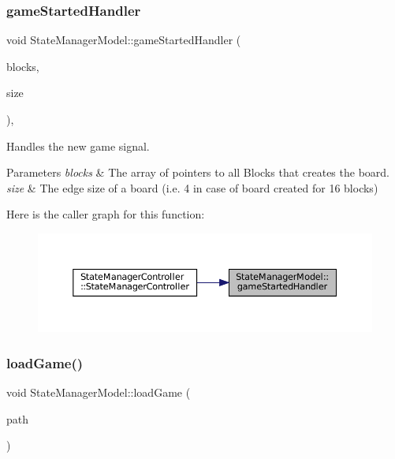 \subsubsection{\texorpdfstring{gameStartedHandler}{gameStartedHandler}}
{\footnotesize\ttfamily void State\+Manager\+Model\+::game\+Started\+Handler (\begin{DoxyParamCaption}\item[{const std\+::vector$<$ std\+::shared\+\_\+ptr$<$ \mbox{\hyperlink{class_block}{Block}}$<$ \mbox{\hyperlink{class_block_layout_item}{Block\+Layout\+Item}} $>$$>$$>$ \&}]{blocks,  }\item[{const size\+\_\+t \&}]{size }\end{DoxyParamCaption})\hspace{0.3cm}{\ttfamily [inline]}, {\ttfamily [slot]}}



Handles the new game signal. 


\begin{DoxyParams}{Parameters}
{\em blocks} & The array of pointers to all Blocks that creates the board. \\
\hline
{\em size} & The edge size of a board (i.\+e. 4 in case of board created for 16 blocks) \\
\hline
\end{DoxyParams}
Here is the caller graph for this function\+:
\nopagebreak
\begin{figure}[H]
\begin{center}
\leavevmode
\includegraphics[width=350pt]{class_state_manager_model_a414fe4dfa55aa139c26b3ccd002328ff_icgraph}
\end{center}
\end{figure}
\mbox{\label{class_state_manager_model_abf3febd681c98f8522bd52944e720618}} 
\subsubsection{\texorpdfstring{loadGame()}{loadGame()}}
{\footnotesize\ttfamily void State\+Manager\+Model\+::load\+Game (\begin{DoxyParamCaption}\item[{const Q\+String \&}]{path }\end{DoxyParamCaption})}



